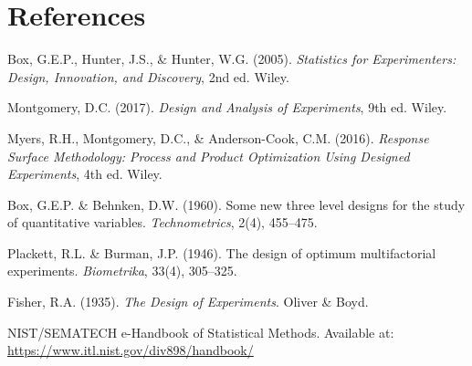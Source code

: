 \documentclass[11pt]{book}
\begin{document}
\chapter*{References}

\begin{enumerate}[label={[\arabic*]}, leftmargin=2em]
\item Box, G.E.P., Hunter, J.S., \& Hunter, W.G. (2005). \textit{Statistics for
  Experimenters: Design, Innovation, and Discovery}, 2nd ed. Wiley.

\item Montgomery, D.C. (2017). \textit{Design and Analysis of Experiments},
  9th ed. Wiley.

\item Myers, R.H., Montgomery, D.C., \& Anderson-Cook, C.M. (2016).
  \textit{Response Surface Methodology: Process and Product Optimization Using
  Designed Experiments}, 4th ed. Wiley.

\item Box, G.E.P. \& Behnken, D.W. (1960). Some new three level designs for the
  study of quantitative variables. \textit{Technometrics}, 2(4), 455--475.

\item Plackett, R.L. \& Burman, J.P. (1946). The design of optimum multifactorial
  experiments. \textit{Biometrika}, 33(4), 305--325.

\item Fisher, R.A. (1935). \textit{The Design of Experiments}. Oliver \& Boyd.

\item NIST/SEMATECH e-Handbook of Statistical Methods. Available at:
  \url{https://www.itl.nist.gov/div898/handbook/}
\end{enumerate}
\end{document}
